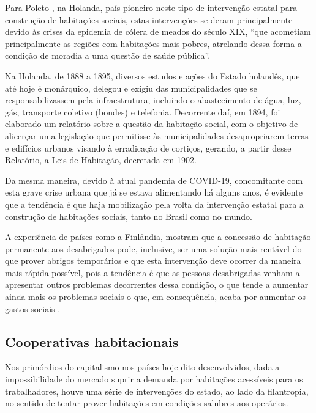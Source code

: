 \documentclass[
	12pt,				%
	oneside,			%
	a4paper,			%
	chapter=TITLE,		%
	section=TITLE,		%
	english,			%
	brazil				%
	]{abntex2}
\begin{document}
\begin{refsection}
Para Poleto \autocite*[37]{poleto}, na Holanda, país pioneiro neste tipo de intervenção
estatal para construção de habitações sociais, estas intervenções se deram
principalmente devido às crises da epidemia de cólera de meados do século XIX,
``que acometiam principalmente as regiões com habitações mais pobres, atrelando
dessa forma a condição de moradia a uma questão de saúde pública''.
\begin{citacao}
Na Holanda, de 1888 a 1895, diversos estudos e ações do Estado holandês, que até
hoje é monárquico, delegou e exigiu das municipalidades que se
responsabilizassem pela infraestrutura, incluindo o abastecimento de água, luz,
gás, transporte coletivo (bondes) e telefonia.
Decorrente daí, em 1894, foi elaborado um relatório sobre a questão da habitação
social, com o objetivo de alicerçar uma legislação que permitisse às
municipalidades desapropriarem terras e edifícios urbanos visando à erradicação
de cortiços, gerando, a partir desse Relatório, a Leis de Habitação, decretada
em 1902.
\cite[p.~317]{poleto}
\end{citacao}
Da mesma maneira, devido à atual pandemia de COVID-19, concomitante com esta
grave crise urbana que já se estava alimentando há alguns anos, é evidente que
a tendência é que haja mobilização pela volta da intervenção estatal para a
construção de habitações sociais, tanto no Brasil como no mundo.

A experiência de países como a Finlândia, mostram que a concessão
de habitação permanente aos desabrigados pode, inclusive, ser uma solução mais
rentável do que prover abrigos temporários e que esta intervenção deve ocorrer
da maneira mais rápida possível, pois a tendência é que as pessoas desabrigadas
venham a apresentar outros problemas decorrentes dessa condição, o que tende
a aumentar ainda mais os problemas sociais o que, em consequência, acaba por
aumentar os gastos sociais \autocite{finlandia}.

\hypertarget{cooperativas-habitacionais}{%
\subsection{Cooperativas habitacionais}\label{cooperativas-habitacionais}}

Nos primórdios do capitalismo nos países hoje dito desenvolvidos, dada a
impossibilidade do mercado suprir a demanda por habitações acessíveis para os
trabalhadores, houve uma série de intervenções do estado, ao lado da filantropia,
no sentido de tentar prover habitações em condições salubres aos operários.


\end{refsection}
\end{document}
